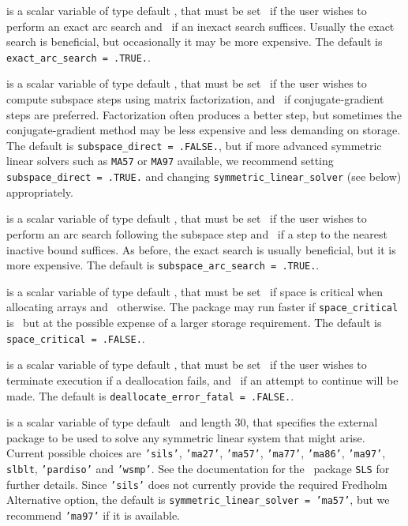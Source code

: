\begin{description}
 is a scalar variable of type default \logical, that
must be set \true\ if the user wishes to perform an exact arc search
and \false\ if an inexact search suffices. Usually the exact search is
beneficial, but occasionally it may be more expensive.
The default is {\tt exact\_arc\_search = .TRUE.}.

 is a scalar variable of type default \logical, that
must be set \true\ if the user wishes to compute subspace steps using
matrix factorization,
and \false\ if conjugate-gradient steps are preferred. Factorization
often produces a better step, but sometimes the conjugate-gradient method
may be less expensive and less demanding on storage.
The default is {\tt subspace\_direct = .FALSE.}, but if more advanced
symmetric linear solvers such as {\tt MA57} or {\tt MA97} available,
we recommend setting {\tt subspace\_direct = .TRUE.} and changing
{\tt symmetric\_linear\_solver} (see below) appropriately.

 is a scalar variable of type default \logical, that
must be set \true\ if the user wishes to perform an arc search following
the subspace step and \false\ if a step to the nearest inactive bound suffices.
As before, the exact search is usually beneficial, but it is more expensive.
The default is {\tt subspace\_arc\_search = .TRUE.}.

 is a scalar variable of type default \logical,
that must be set \true\ if space is critical when allocating arrays
and  \false\ otherwise. The package may run faster if
{\tt space\_critical} is \false\ but at the possible expense of a larger
storage requirement. The default is {\tt space\_critical = .FALSE.}.

 is a scalar variable of type default \logical,
that must be set \true\ if the user wishes to terminate execution if
a deallocation  fails, and \false\ if an attempt to continue
will be made. The default is {\tt deallocate\_error\_fatal = .FALSE.}.

 is a scalar variable of type default \character\
and length 30, that specifies the external package to be used to
solve any symmetric linear system that might arise. Current possible
choices are {\tt 'sils'}, {\tt 'ma27'}, {\tt 'ma57'}, {\tt 'ma77'},
{\tt 'ma86'}, {\tt 'ma97'}, {\tt slblt}, {\tt 'pardiso'}
and {\tt 'wsmp'}.
See the documentation for the \galahad\ package {\tt SLS} for further details.
Since  {\tt 'sils'} does not currently provide the required Fredholm
Alternative option, the default is {\tt symmetric\_linear\_solver = 'ma57'},
but we recommend {\tt 'ma97'} if it is available.


\end{description}
